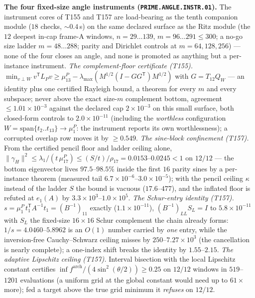 \documentclass[11pt,a4paper]{article}
\theoremstyle{definition}
\begin{document}
\par\smallskip\noindent\textbf{The four fixed-size angle instruments
(\texttt{PRIME.ANGLE.INSTR.01}).}
The instrument cores of T155 and T157 are load-bearing as the tenth
companion module ($18$ checks, ${\sim}0.4$\,s) on the same declared
surface as the Ritz module (the $12$ deepest in-cap frame-A windows,
$n=29\ldots139$, $m=96\ldots291\le300$; a no-go size ladder
$m=48\ldots288$; parity and Dirichlet controls at $m=64,128,256$) ---
none of the four closes an angle, and none is promoted as anything but a
per-instance instrument.
\emph{The complement-floor certificate (T155).}
$\min_{v\perp W}v^{\mathsf T}L_Pv\ge\mu^P_{13}-\lambda_{\max}(M^{1/2}
(I-GG^{\mathsf T})M^{1/2})$ with $G=T_{12}Q_W$ --- an identity plus one
certified Rayleigh bound, a theorem for every $m$ and every subspace;
never above the exact size-$m$ complement bottom, agreement
$\le1.01\times10^{-3}$ against the declared cap $2\times10^{-3}$ on this
small surface, both closed-form controls to $2.0\times10^{-11}$
(including the \emph{worthless} configuration
$W=\mathrm{span}\{t_2..t_{13}\}\to\mu^P_1$: the instrument reports its
own worthlessness); a corrupted overlap row moves it by $\ge0.549$.
\emph{The sine-block confinement (T157).} From the certified pencil
floor and ladder ceiling alone,
$\|\gamma_H\|^2\le\lambda_1/(t\,\mu^P_{17})\le(S/t)/\rho_{17}
=0.0153$--$0.0245<1$ on $12/12$ --- the bottom eigenvector lives
$97.5$--$98.5\%$ inside the first $16$ parity sines by a per-instance
theorem (measured tail $6.7\times10^{-6}$--$3.0\times10^{-5}$); with the
pencil ceiling $\kappa$ instead of the ladder $S$ the bound is vacuous
($17.6$--$477$), and the inflated floor is refuted at $e_1(A)$ by
$3.3\times10^{3}$--$1.0\times10^{5}$.
\emph{The Schur-entry identity (T157).}
$s=\mu^P_1\,t_1^{\mathsf T}A^{-1}t_1=(B^{-1})_{11}$ exactly
($1.1\times10^{-11}$), $(B^{-1})_{LL}S_L=I$ to $5.8\times10^{-11}$ with
$S_L$ the fixed-size $16\times16$ Schur complement the chain already
forms: $1/s=4.0460$--$5.8962$ is an $O(1)$ number carried by \emph{one}
entry, while the inversion-free Cauchy--Schwarz ceiling misses by
$250$--$7.27\times10^{3}$ (the cancellation is nearly complete); a
one-index shift breaks the identity by $1.55$--$2.15$.
\emph{The adaptive Lipschitz ceiling (T157).} Interval bisection with
the local Lipschitz constant certifies
$\inf f^{\mathrm{arch}}/(4\sin^2(\theta/2))\ge0.25$ on $12/12$ windows in
$519$--$1201$ evaluations (a uniform grid at the global constant would
need up to $61\times$ more); fed a target above the true grid minimum it
\emph{refuses} on $12/12$.
\end{document}
